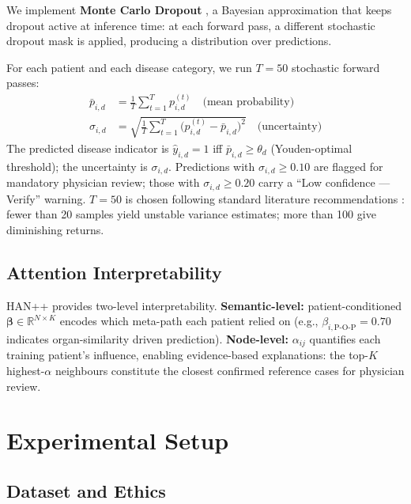 \documentclass[conference]{IEEEtran}
\begin{document}
We implement \textbf{Monte Carlo Dropout} \cite{gal_2016}, a Bayesian
approximation that keeps dropout active at inference time:
at each forward pass, a different stochastic dropout mask is applied,
producing a distribution over predictions.

For each patient and each disease category, we run $T = 50$ stochastic forward passes:
\begin{align}
  \bar{p}_{i,d} &= \frac{1}{T}\sum_{t=1}^{T} p_{i,d}^{(t)}
  \quad \text{(mean probability)} \\
  \sigma_{i,d}  &= \sqrt{\frac{1}{T}\sum_{t=1}^{T}
                    \bigl(p_{i,d}^{(t)} - \bar{p}_{i,d}\bigr)^2}
  \quad \text{(uncertainty)}
\end{align}
The predicted disease indicator is $\hat{y}_{i,d} = 1$ iff
$\bar{p}_{i,d} \geq \theta_d$ (Youden-optimal threshold);
the uncertainty is $\sigma_{i,d}$.
Predictions with $\sigma_{i,d} \geq 0.10$ are flagged for mandatory
physician review; those with $\sigma_{i,d} \geq 0.20$ carry a
``Low confidence --- Verify'' warning.
$T = 50$ is chosen following standard literature recommendations
\cite{gal_2016, leibig_2017}: fewer than 20 samples yield unstable
variance estimates; more than 100 give diminishing returns.

\subsection{Attention Interpretability}
\label{subsec:interpretability}

HAN++ provides two-level interpretability.
\textbf{Semantic-level:} patient-conditioned $\boldsymbol{\beta} \in \mathbb{R}^{N \times K}$
encodes which meta-path each patient relied on (e.g., $\beta_{i,\text{P-O-P}} = 0.70$
indicates organ-similarity driven prediction).
\textbf{Node-level:} $\alpha_{ij}$ quantifies each training patient's influence,
enabling evidence-based explanations: the top-$K$ highest-$\alpha$ neighbours
constitute the closest confirmed reference cases for physician review.

\section{Experimental Setup}
\label{sec:experiments}

\subsection{Dataset and Ethics}
\label{subsec:dataset}
\end{document}
